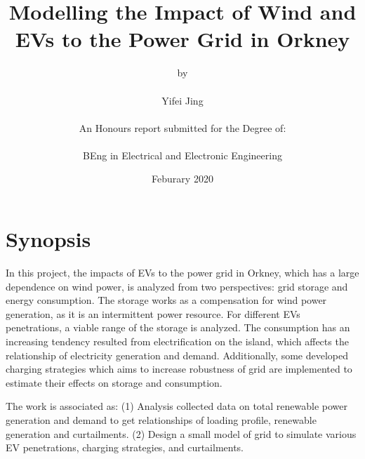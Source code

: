 \documentclass[12pt,a4paper]{report}
\begin{document}
    \onehalfspacing
    \title{\textbf{Modelling the Impact of Wind and EVs to the Power Grid in Orkney}}
    \author{by \\ \\ Yifei Jing \\ \\ An Honours report submitted for the Degree of: \\ \\
    BEng in Electrical and Electronic Engineering}
    \date{Feburary 2020}
    \maketitle
    \setlength\parindent{0pt}

    \cleardoublepage  
    \tableofcontents

    \cleardoublepage  
    \listoffigures

    \cleardoublepage  
    \listoftables
    \chapter*{Synopsis}
        In this project, the impacts of EVs to the power grid in Orkney, which has a large dependence on wind power, is analyzed from two perspectives: grid storage and energy consumption.
        The storage works as a compensation for wind power generation, as it is an intermittent power resource. For different EVs penetrations, a viable range of the storage is analyzed. The consumption has an increasing tendency resulted from electrification on the island, which affects the relationship of electricity generation and demand. Additionally,
        some developed charging strategies which aims to increase robustness of grid are implemented to estimate their effects on storage and consumption. 

        The work is associated as: (1) Analysis collected data on total renewable power generation and demand to get relationships of loading profile, renewable generation and curtailments.
        (2) Design a small model of grid to simulate various EV penetrations, charging strategies, and curtailments.
\end{document}

